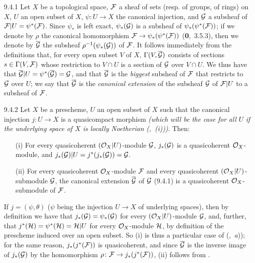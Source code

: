 \documentclass[../main.tex]{subfiles}
\begin{document}
\begin{env}{9.4.1}
Let $X$ be a topological space, $\mathcal{F}$ a
sheaf of sets (resp. of groups, of rings) on $X$, $U$ an open subset of $X$,
$\psi\colon U\to X$ the canonical injection, and $\mathcal{G}$ a subsheaf of
$\mathcal{F}|U=\psi^\ast(\mathcal{F})$.  Since $\psi_\ast$ is left exact,
$\psi_\ast(\mathcal{G})$ is a subsheaf of $\psi_\ast(\psi^\ast(\mathcal{F}))$; if we denote
by $\rho$ the canonical homomorphism $\mathcal{F}\to\psi_\ast(\psi^\ast(\mathcal{F}))$
(\textbf{0},~3.5.3), then we denote by $\overline{\mathcal{G}}$ the subsheaf
$\rho^{-1}(\psi_\ast(\mathcal{G}))$ of $\mathcal{F}$.  It follows immediately from the
definitions that, for every open subset $V$ of $X$,
$\Gamma(V,\overline{\mathcal{G}})$ consists of sections $s\in\Gamma(V,\mathcal{F})$
whose restriction to $V\cap U$ is a section of $\mathcal{G}$ over $V\cap U$.  We
thus have that $\overline{\mathcal{G}}|U=\psi^\ast(\overline{\mathcal{G}})=\mathcal{G}$,
and that $\overline{\mathcal{G}}$ is the \emph{biggest} subsheaf of $\mathcal{F}$
that restricts to $\mathcal{G}$ over $U$; we say that $\overline{\mathcal{G}}$ is
the \emph{canonical extension} of the subsheaf $\mathcal{G}$ of $\mathcal{F}|U$ to a
subsheaf of $\mathcal{F}$.
\end{env}

\begin{env}[Proposition]{9.4.2}
Let $X$ be a prescheme, $U$ an open subset of
$X$ such that the canonical injection $j\colon U\to X$ is a quasicompact
morphism \emph{(which will be the case for \emph{all} $U$ if the underlying
space of $X$ is \emph{locally Noetherian} {\normalfont(,~(i))})}.  Then:
\begin{itemize}
  \item[(i)] For every quasicoherent $(\mathcal{O}_X|U)$-module $\mathcal{G}$, $j_\ast(\mathcal{G})$ is a quasicoherent
$\mathcal{O}_X$-module, and $j_\ast(\mathcal{G})|U=j^\ast(j_\ast(\mathcal{G}))=\mathcal{G}$.
  \item[(ii)] For every quasicoherent $\mathcal{O}_X$-module $\mathcal{F}$ and every quasicoherent
$(\mathcal{O}_X|U)$-submodule $\mathcal{G}$, the canonical extension
$\overline{\mathcal{G}}$ of $\mathcal{G}$ {\normalfont(9.4.1)} is a quasicoherent
$\mathcal{O}_X$-submodule of $\mathcal{F}$.
\end{itemize}
\end{env}

If $j=(\psi,\theta)$ ($\psi$ being the injection $U\to X$ of underlying spaces),
then by definition we have that $j_\ast(\mathcal{G})=\psi_\ast(\mathcal{G})$ for every
$(\mathcal{O}_X|U)$-module $\mathcal{G}$, and, further, that
$j^\ast(\mathcal{H})=\psi^\ast(\mathcal{H})=\mathcal{H}|U$ for every $\mathcal{O}_X$-module
$\mathcal{H}$, by definition of the prescheme induced over an open subset.  So (i)
is thus a particular case of (,~\emph{a})); for the same reason,
$j_\ast(j^\ast(\mathcal{F}))$ is quasicoherent, and since $\overline{\mathcal{G}}$ is the
inverse image of $j_\ast(\mathcal{G})$ by the homomorphism $\rho\colon\mathcal{F}\to
j_\ast(j^\ast(\mathcal{F}))$, (ii) follows from .
 
\end{document}
